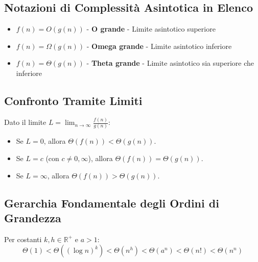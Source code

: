 \subsection*{Notazioni di Complessità Asintotica in Elenco}

\begin{itemize}
    \item $f(n) = O(g(n))$ - \textbf{O grande} - Limite asintotico superiore
    \item $f(n) = \Omega(g(n))$ - \textbf{Omega grande} - Limite asintotico inferiore
    \item $f(n) = \Theta(g(n))$ - \textbf{Theta grande} - Limite asintotico sia superiore che inferiore
\end{itemize}

\subsection*{Confronto Tramite Limiti}
Dato il limite $L = \lim_{n\to\infty} \frac{f(n)}{g(n)}$:
\begin{itemize}
    \item Se $L = 0$, allora $\Theta(f(n)) < \Theta(g(n))$.
    \item Se $L = c$ (con $c \neq 0, \infty$), allora $\Theta(f(n)) = \Theta(g(n))$.
    \item Se $L = \infty$, allora $\Theta(f(n)) > \Theta(g(n))$.
\end{itemize}

\subsection*{Gerarchia Fondamentale degli Ordini di Grandezza}
Per costanti $k,h \in \mathbb{R}^+$ e $a>1$:
$$ \Theta(1) < \Theta((\log n)^{k}) < \Theta(n^{h}) < \Theta(a^{n}) < \Theta(n!) < \Theta(n^{n}) $$

